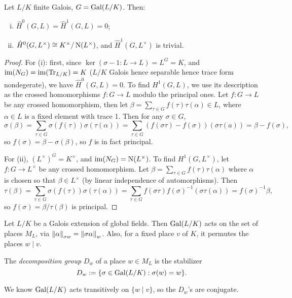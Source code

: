\documentclass[11pt]{amsart}
\begin{document}
\begin{lem}
    Let $L/K$ finite Galois, $G = \operatorname{Gal}(L/K)$. Then:
    \begin{enumerate}[(i)]
        \item $\hat{H}^0(G,L) = \hat{H}^1(G,L) = 0$;
        \item $\hat{H}^0(G,L^\times) \cong K^\times/\operatorname{N}(L^\times)$, and $\hat{H}^1(G,L^\times)$ is trivial.
    \end{enumerate}
\end{lem}

\begin{proof}
    For (i): first, since $\ker(\sigma-1: L\to L) = L^G = K$, and $\operatorname{im}(N_G) = \operatorname{im}(\operatorname{Tr}_{L/K}) = K$ ($L/K$ Galois hence separable hence trace form nondegerate), we have $\hat{H}^0(G,L) = 0$. To find $H^1(G,L)$, we use its description as the crossed homomorphisms $f:G\to L$ modulo the principal ones. Let $f:G\to L$ be any crossed homomorphism, then let $\beta = \sum_{\tau\in G}f(\tau)\tau(\alpha)\in L$, where $\alpha\in L$ is a fixed element with trace 1. Then for any $\sigma\in G$,
    \[\sigma(\beta) = \sum_{\tau\in G}\sigma(f(\tau))\sigma(\tau(\alpha)) = \sum_{\tau\in G}(f(\sigma\tau) - f(\sigma))(\sigma\tau(a)) = \beta - f(\sigma),\]
    so $f(\sigma) = \beta - \sigma(\beta)$, so $f$ is in fact principal.

    For (ii), $(L^\times)^G = K^\times$, and $\operatorname{im}(N_G) = \operatorname{N}(L^\times)$. To find $H^1(G,L^\times)$, let $f:G\to L^\times$ be any crossed homomorphism. Let $\beta = \sum_{\tau\in G} f(\tau)\tau(\alpha)$ where $\alpha$ is chosen so that $\beta\in L^\times$ (by linear independence of automorphisms). Then
    \[\tau(\beta) = \sum_{\tau\in G} \sigma(f(\tau))\sigma(\tau(\alpha)) = \sum_{\tau\in G} f(\sigma\tau)f(\sigma)^{-1} (\sigma\tau(\alpha)) = f(\sigma)^{-1}\beta,\]
    so $f(\sigma) = \beta/\tau(\beta)$ is principal.
\end{proof}

Let $L/K$ be a Galois extension of global fields. Then $\operatorname{Gal}(L/K)$ acts on the set of places $M_L$, via $\left\| \alpha \right\|_{\sigma w} = \left\| \sigma\alpha \right\|_w$. Also, for a fixed place $v$ of $K$, it permutes the places $w\mid v$.


\begin{defn}
    The \emph{decomposition group} $D_w$ of a place $w\in M_L$ is the stabilizer
    \[D_w := \{\sigma\in \operatorname{Gal}(L/K): \sigma(w) = w\}.\]
\end{defn}

We know $\operatorname{Gal}(L/K)$ acts transitively on $\{w\mid v\}$, so the $D_w$'s are conjugate.
\end{document}
